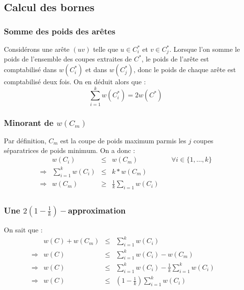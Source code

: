 \documentclass[a4paper, 11pt]{article}
\begin{document}
\subsection*{Calcul des bornes}

\subsubsection*{Somme des poids des ar\^{e}tes}

Consid\'{e}rons une ar\^{e}te $(uv)$ telle que $u \in C_i^*$ et $v \in C_j^*$. Lorsque l'on somme le poids
de l'ensemble des coupes extraites de $C^*$, le poids de l'ar\^{e}te est comptabilis\'{e} dans $w(C_i^*)$ et
dans $w(C_j^*)$, donc le poids de chaque ar\^{e}te est comptabilis\'{e} deux fois. On en d\'{e}duit alors que :
$$
\sum_{i=1}^k w(C_i^*) = 2 w(C^*)
$$

\subsubsection*{Minorant de $w(C_m)$}

Par d\'{e}finition, $C_m$ est la coupe de poids maximum parmis les $j$ coupes s\'{e}paratrices de poids
minimum. On a donc : $$
\begin{array}{rrcll}
    & w(C_i) & \leq & w(C_m) & \quad \forall i \in \{1, \dots, k\} \\
    \Rightarrow & \sum_{i = 1}^k w(C_i) & \leq & k * w(C_m) & \\
    \Rightarrow & w(C_m) & \geq & \frac{1}{k} \sum_{i = 1} w(C_i) & \\
\end{array}
$$

\subsubsection*{Une $2( 1 - \frac{1}{k})-$approximation}

On sait que : $$
\begin{array}{rrcll}
    & w(C) + w(C_m) & \leq & \sum_{i=1}^k w(C_i) & \\
    \Rightarrow & w(C) & \leq & \sum_{i=1}^k w(C_i) - w(C_m) & \\
    \Rightarrow & w(C) & \leq & \sum_{i=1}^k w(C_i) - \frac{1}{k} \sum_{i=1}^k w(C_i) & \\
    \Rightarrow & w(C) & \leq & (1 - \frac{1}{k}) \sum_{i=1}^k w(C_i) & \\
\end{array} $$
\end{document}
